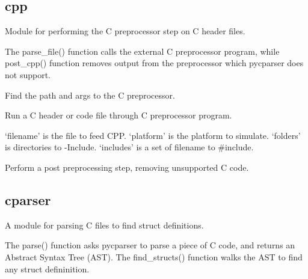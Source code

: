\documentclass[A4paper,10pt,english]{sphinxmanual}
\begin{document}
\subsection{cpp}
\label{devel/code:cpp}\label{devel/code:module-cpp}
Module for performing the C preprocessor step on C header files.

The parse\_file() function calls the external C preprocessor program,
while post\_cpp() function removes output from the preprocessor which
pycparser does not support.

\begin{fulllineitems}
\label{devel/code:cpp._get_cpp}
Find the path and args to the C preprocessor.

\end{fulllineitems}


\begin{fulllineitems}
\label{devel/code:cpp.parse_file}
Run a C header or code file through C preprocessor program.

`filename' is the file to feed CPP.
`platform' is the platform to simulate.
`folders' is directories to -Include.
`includes' is a set of filename to \#include.

\end{fulllineitems}


\begin{fulllineitems}
\label{devel/code:cpp.post_cpp}
Perform a post preprocessing step, removing unsupported C code.

\end{fulllineitems}



\subsection{cparser}
\label{devel/code:cparser}\label{devel/code:module-cparser}
A module for parsing C files to find struct definitions.

The parse() function asks pycparser to parse a piece of C code, and
returns an Abstract Syntax Tree (AST). The find\_structs() function
walks the AST to find any struct defininition.
\end{document}
